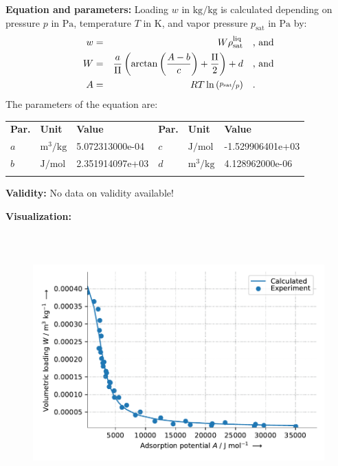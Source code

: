 \textbf{Equation and parameters:}
\newline
%
Loading $w$ in $\si{\kilogram\per\kilogram}$ is calculated depending on pressure $p$ in $\si{\pascal}$, temperature $T$ in $\si{\kelvin}$, and vapor pressure $p_\mathrm{sat}$ in $\si{\pascal}$ by:
%
\begin{equation*}
\begin{split}
w &=& W \rho_\mathrm{sat}^{\mathrm{liq}} & \quad\text{, and} \\
W &=& \frac{a}{\Pi} \left( \arctan \left( \frac{A - b}{c} \right) + \frac{\Pi}{2}\right) + d & \quad\text{, and} \\
A &=& R T \ln \left( \nicefrac{p_\mathrm{sat}}{p} \right) & \quad\text{.} \\
\end{split}
\end{equation*}
%
The parameters of the equation are:
%
\begin{longtable}[l]{lll|lll}
\toprule
\addlinespace
\textbf{Par.} & \textbf{Unit} & \textbf{Value} &	\textbf{Par.} & \textbf{Unit} & \textbf{Value} \\
\addlinespace
\midrule
\endhead

\bottomrule
\endfoot
\bottomrule
\endlastfoot
\addlinespace

$a$ & $\si{\cubic\meter\per\kilogram}$ & 5.072313000e-04 & $c$ & $\si{\joule\per\mole}$ & -1.529906401e+03 \\
$b$ & $\si{\joule\per\mole}$ & 2.351914097e+03 & $d$ & $\si{\cubic\meter\per\kilogram}$ & 4.128962000e-06 \\

\addlinespace\end{longtable}

\textbf{Validity:}
\newline
No data on validity available!
\newline

\textbf{Visualization:}
%
\begin{figure}[!htp]
{\noindent\includegraphics[height=10cm, keepaspectratio]{figs/ads/ads_Water_silica_gel_pellet_123_DubininArctan1_1.pdf}}
\end{figure}
%

